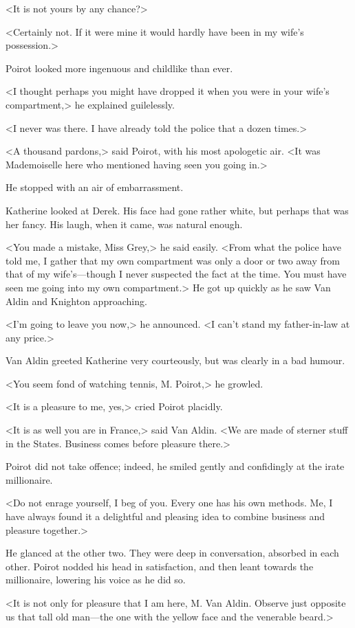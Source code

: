 <It is not yours by any chance?>

<Certainly not. If it were mine it would hardly have been in my wife's possession.>

Poirot looked more ingenuous and childlike than ever.

<I thought perhaps you might have dropped it when you were in your wife's compartment,> he explained guilelessly.

<I never was there. I have already told the police that a dozen times.>

<A thousand pardons,> said Poirot, with his most apologetic air. <It was Mademoiselle here who mentioned having seen you going in.>

He stopped with an air of embarrassment.

Katherine looked at Derek. His face had gone rather white, but perhaps that was her fancy. His laugh, when it came, was natural enough.

<You made a mistake, Miss Grey,> he said easily. <From what the police have told me, I gather that my own compartment was only a door or two away from that of my wife's—though I never suspected the fact at the time. You must have seen me going into my own compartment.> He got up quickly as he saw Van Aldin and Knighton approaching.

<I'm going to leave you now,> he announced. <I can't stand my father-in-law at any price.>

Van Aldin greeted Katherine very courteously, but was clearly in a bad humour.

<You seem fond of watching tennis, M. Poirot,> he growled.

<It is a pleasure to me, yes,> cried Poirot placidly.

<It is as well you are in France,> said Van Aldin. <We are made of sterner stuff in the States. Business comes before pleasure there.>

Poirot did not take offence; indeed, he smiled gently and confidingly at the irate millionaire.

<Do not enrage yourself, I beg of you. Every one has his own methods. Me, I have always found it a delightful and pleasing idea to combine business and pleasure together.>

He glanced at the other two. They were deep in conversation, absorbed in each other. Poirot nodded his head in satisfaction, and then leant towards the millionaire, lowering his voice as he did so.

<It is not only for pleasure that I am here, M. Van Aldin. Observe just opposite us that tall old man—the one with the yellow face and the venerable beard.>

